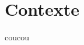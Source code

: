 \thispagestyle{empty}\cleardoublepage
\titleformat{\chapter}[display]
		{\normalfont\huge\bfseries}{}{20pt}{\Huge}
\chapter{Contexte}

coucou~\cite{Sarazin}
